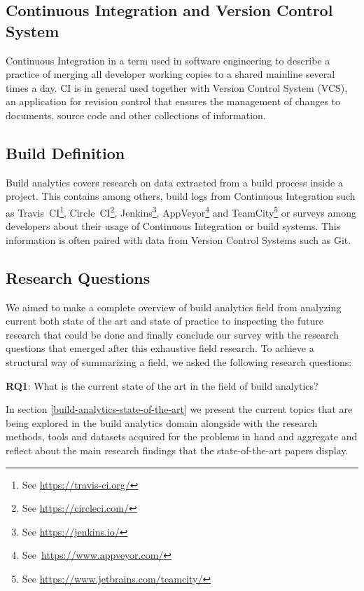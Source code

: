\documentclass[]{book}
\let\rmarkdownfootnote\footnote%
\def\footnote{\protect\rmarkdownfootnote}
\begin{document}
\subsection{Continuous Integration and Version Control
System}\label{continuous-integration-and-version-control-system}

Continuous Integration in a term used in software engineering to
describe a practice of merging all developer working copies to a shared
mainline several times a day. CI is in general used together with
Version Control System (VCS), an application for revision control that
ensures the management of changes to documents, source code and other
collections of information.

\subsection{Build Definition}\label{build-definition}

Build analytics covers research on data extracted from a build process
inside a project. This contains among others, build logs from Continuous
Integration such as Travis~CI\footnote{See \url{https://travis-ci.org/}},
Circle~CI\footnote{See \url{https://circleci.com/}}, Jenkins\footnote{See
  \url{https://jenkins.io/}}, AppVeyor\footnote{See~\url{https://www.appveyor.com/}}
and TeamCity\footnote{See \url{https://www.jetbrains.com/teamcity/}} or
surveys among developers about their usage of Continuous Integration or
build systems. This information is often paired with data from Version
Control Systems such as Git.

\subsection{Research Questions}\label{research-questions}

We aimed to make a complete overview of build analytics field from
analyzing current both state of the art and state of practice to
inspecting the future research that could be done and finally conclude
our survey with the research questions that emerged after this
exhaustive field research. To achieve a structural way of summarizing a
field, we asked the following research questions:

\textbf{RQ1}: What is the current state of the art in the field of build
analytics?

In section \ref{build-analytics-state-of-the-art} we present the current
topics that are being explored in the build analytics domain alongside
with the research methods, tools and datasets acquired for the problems
in hand and aggregate and reflect about the main research findings that
the state-of-the-art papers display.
\end{document}
